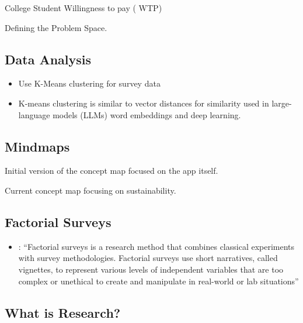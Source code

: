 \documentclass[
  letterpaper,
  DIV=11,
  numbers=noendperiod]{scrartcl}
\providecommand{\tightlist}{%
  \setlength{\itemsep}{0pt}\setlength{\parskip}{0pt}}\usepackage{longtable,booktabs,array}
\begin{document}
College Student Willingness to pay ( WTP)

Defining the Problem Space.

\subsection{Data Analysis}\label{data-analysis}

\begin{itemize}
\tightlist
\item
  Use K-Means clustering for survey data
\item
  K-means clustering is similar to vector distances for similarity used
  in large-language models (LLMs) word embeddings and deep learning.
\end{itemize}

\subsection{Mindmaps}\label{mindmaps}

Initial version of the concept map focused on the app itself.

Current concept map focusing on sustainability.

\subsection{Factorial Surveys}\label{factorial-surveys}

\begin{itemize}
\tightlist
\item
  \citet{li2022assessing}: ``Factorial surveys is a research method that
  combines classical experiments with survey methodologies. Factorial
  surveys use short narratives, called vignettes, to represent various
  levels of independent variables that are too complex or unethical to
  create and manipulate in real-world or lab situations''
\end{itemize}

\subsection{What is Research?}\label{what-is-research}
\end{document}

